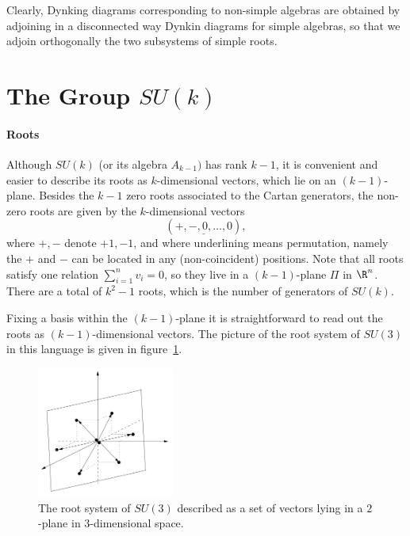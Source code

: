 Clearly, Dynking diagrams corresponding to non-simple algebras are obtained by adjoining in a disconnected way Dynkin diagrams for simple algebras, so that we adjoin orthogonally the two subsystems of simple roots.

\section{The Group \texorpdfstring{$SU(k)$}{SU(k)}}
\paragraph{Roots}
Although $SU(k)$ (or its algebra $A_{k-1})$ has rank $k-1$, it is convenient and easier to describe its roots as $k$-dimensional vectors, which lie on an $(k-1)$-plane. Besides the $k-1$ zero roots associated to the Cartan generators, the non-zero roots are given by the $k$-dimensional vectors  
\begin{equation}
    (\underline{+,-,0,\dots,0}),
\end{equation}
where $+,-$ denote $+1, -1$, and where underlining means permutation, namely the $+$ and $-$ can be located in any (non-coincident) positions. Note that all roots satisfy one relation $\sum_{i=1}^n v_i = 0$, so they live in a $(k-1)$-plane $\Pi$ in $\R^n$. There are a total of $k^2-1$ roots, which is the number of generators of $SU(k)$.

Fixing a basis within the $(k-1)$-plane it is straightforward to read out the roots as $(k-1)$-dimensional vectors. The picture of the root system of $SU(3)$ in this language is given in figure~\ref{fig:su3-root-system}.

\begin{figure}
    \centering
    \includegraphics[width=0.4\textwidth]{figures/su3-root-system.png}
    \caption{The root system of $SU(3)$ described as a set of vectors lying in a $2$-plane in $3$-dimensional space.}
    \label{fig:su3-root-system}
\end{figure}

